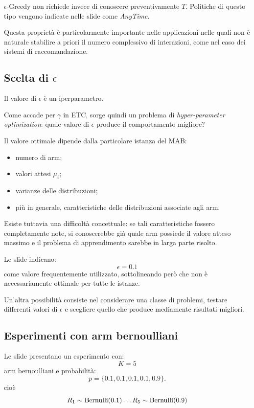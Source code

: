 $\epsilon$-Greedy non richiede invece di conoscere preventivamente $T$. Politiche di questo tipo vengono indicate nelle slide come \emph{AnyTime}.

Questa proprietà è particolarmente importante nelle applicazioni nelle quali non è naturale stabilire a priori il numero complessivo di interazioni, come nel caso dei sistemi di raccomandazione.

\subsection{Scelta di $\epsilon$}

Il valore di $\epsilon$ è un iperparametro.

Come accade per $\gamma$ in ETC, sorge quindi un problema di \emph{hyper-parameter optimization}: quale valore di $\epsilon$ produce il comportamento migliore?

Il valore ottimale dipende dalla particolare istanza del MAB:
\begin{itemize}
    \item numero di arm;
    \item valori attesi $\mu_i$;
    \item varianze delle distribuzioni;
    \item più in generale, caratteristiche delle distribuzioni associate agli arm.
\end{itemize}

Esiste tuttavia una difficoltà concettuale: se tali caratteristiche fossero completamente note, si conoscerebbe già quale arm possiede il valore atteso massimo e il problema di apprendimento sarebbe in larga parte risolto.

Le slide indicano:
\[
\epsilon=0.1
\]
come valore frequentemente utilizzato, sottolineando però che non è necessariamente ottimale per tutte le istanze.

Un'altra possibilità consiste nel considerare una classe di problemi, testare differenti valori di $\epsilon$ e scegliere quello che produce mediamente risultati migliori.

\subsection{Esperimenti con arm bernoulliani}

Le slide presentano un esperimento con:
\[
K=5
\]
arm bernoulliani e probabilità:
\[
p=\{0.1,0.1,0.1,0.1,0.9\}.
\]
cioè
\[
R_1 \sim \text{Bernulli(0.1)} \\
\dots
R_5 \sim \text{Bernulli(0.9)} \\
\]


